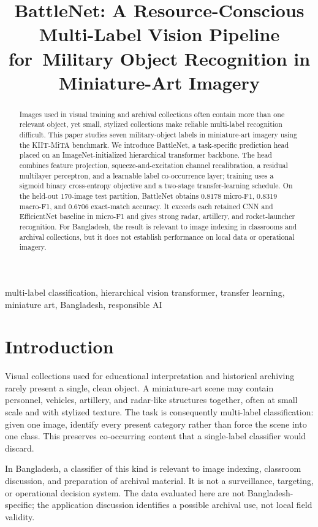 \documentclass[conference]{IEEEtran}
\title{BattleNet: A Resource-Conscious Multi-Label Vision Pipeline for\
Military Object Recognition in Miniature-Art Imagery}
\author{\IEEEauthorblockN{Anonymous Author(s)}
\IEEEauthorblockA{Author details withheld for review\\
Bangladesh}}
\begin{document}
\maketitle

\begin{abstract}
Images used in visual training and archival collections often contain more than one relevant object, yet small, stylized collections make reliable multi-label recognition difficult. This paper studies seven military-object labels in miniature-art imagery using the KIIT-MiTA benchmark. We introduce BattleNet, a task-specific prediction head placed on an ImageNet-initialized hierarchical transformer backbone. The head combines feature projection, squeeze-and-excitation channel recalibration, a residual multilayer perceptron, and a learnable label co-occurrence layer; training uses a sigmoid binary cross-entropy objective and a two-stage transfer-learning schedule. On the held-out 170-image test partition, BattleNet obtains 0.8178 micro-F1, 0.8319 macro-F1, and 0.6706 exact-match accuracy. It exceeds each retained CNN and EfficientNet baseline in micro-F1 and gives strong radar, artillery, and rocket-launcher recognition. For Bangladesh, the result is relevant to image indexing in classrooms and archival collections, but it does not establish performance on local data or operational imagery.
\end{abstract}

\begin{IEEEkeywords}
multi-label classification, hierarchical vision transformer, transfer learning, miniature art, Bangladesh, responsible AI
\end{IEEEkeywords}

\section{Introduction}
Visual collections used for educational interpretation and historical archiving rarely present a single, clean object. A miniature-art scene may contain personnel, vehicles, artillery, and radar-like structures together, often at small scale and with stylized texture. The task is consequently multi-label classification: given one image, identify every present category rather than force the scene into one class. This preserves co-occurring content that a single-label classifier would discard.

In Bangladesh, a classifier of this kind is relevant to image indexing, classroom discussion, and preparation of archival material. It is not a surveillance, targeting, or operational decision system. The data evaluated here are not Bangladesh-specific; the application discussion identifies a possible archival use, not local field validity.
\end{document}
